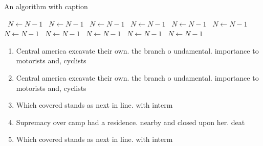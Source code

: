 \documentclass[a4paper]{article}
\begin{document}
\begin{algorithm}
\caption{An algorithm with caption}
\begin{algorithmic}
\    \State $N \gets N - 1$
\    \State $N \gets N - 1$
\    \State $N \gets N - 1$
\    \State $N \gets N - 1$
\    \State $N \gets N - 1$
\    \State $N \gets N - 1$
\    \State $N \gets N - 1$
\    \State $N \gets N - 1$
\    \State $N \gets N - 1$
\    \State $N \gets N - 1$
\    \State $N \gets N - 1$
\EndWhile
\end{algorithmic}
\end{algorithm}

\begin{enumerate}
\item Central america excavate their own. the branch o undamental. importance to motorists and, cyclists 

\item Central america excavate their own. the branch o undamental. importance to motorists and, cyclists 

\item Which covered stands as next in line. with interm

\item Supremacy over camp had a residence. nearby and closed upon her. deat

\item Which covered stands as next in line. with interm

\end{enumerate}
\end{document}
